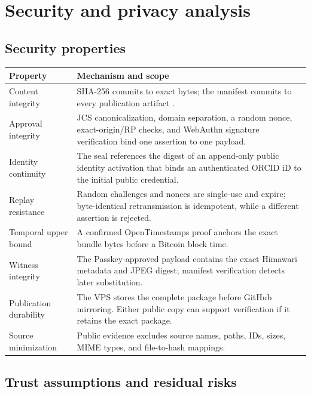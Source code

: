 \documentclass[11pt,a4paper]{article}
\begin{document}
\section{Security and privacy analysis}

\subsection{Security properties}

\begin{longtable}{>{\raggedright\arraybackslash}p{}>{\raggedright\arraybackslash}p{}}
\toprule
Property & Mechanism and scope \\
\midrule
\endhead
Content integrity & SHA-256 commits to exact bytes; the manifest commits to every publication artifact \cite{nist2015}. \\
Approval integrity & JCS canonicalization, domain separation, a random nonce, exact-origin/RP checks, and WebAuthn signature verification bind one assertion to one payload. \\
Identity continuity & The seal references the digest of an append-only public identity activation that binds an authenticated ORCID iD to the initial public credential. \\
Replay resistance & Random challenges and nonces are single-use and expire; byte-identical retransmission is idempotent, while a different assertion is rejected. \\
Temporal upper bound & A confirmed OpenTimestamps proof anchors the exact bundle bytes before a Bitcoin block time. \\
Witness integrity & The Passkey-approved payload contains the exact Himawari metadata and JPEG digest; manifest verification detects later substitution. \\
Publication durability & The VPS stores the complete package before GitHub mirroring. Either public copy can support verification if it retains the exact package. \\
Source minimization & Public evidence excludes source names, paths, IDs, sizes, MIME types, and file-to-hash mappings. \\
\bottomrule
\end{longtable}

\subsection{Trust assumptions and residual risks}
\end{document}

